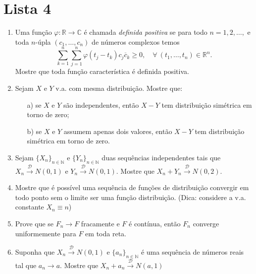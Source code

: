 \chapter*{Lista 4}
\chaptermark{}


\begin{enumerate}[leftmargin=*]


\item 
Uma função $\varphi :\mathbb{R}\to\mathbb{C}$
é chamada {\it definida positiva} se para todo
$n=1,2,\ldots,$ e toda $n$-úpla $(c_1,\ldots,c_n)$
de números complexos temos
\[
	\sum_{k=1}^{n}\sum_{j=1}^{n}
	\varphi(t_j-t_k)c_j\overline{c}_k
	\geq 0,
	\quad
	\forall \ (t_1,\ldots,t_n)\in\mathbb{R}^n.
\]
Mostre que toda função característica é definida positiva.  


\item
Sejam $X$ e $Y$ v.a. com mesma distribuição. 
Mostre que: 
	\begin{itemize}
	\item[a)]
	se $X$ e $Y$ são independentes, então $X-Y$ tem
	distribuição simétrica em torno de zero;
	
	\item[b)]
	se $X$ e $Y$ assumem apenas dois valores, então 
	$X-Y$ tem distribuição simétrica em torno de zero.
	\end{itemize}



\item 
Sejam $\{X_n\}_{n\in\mathbb{N}}$ e $\{Y_n\}_{n\in\mathbb{N}}$
duas sequências independentes tais que  
$X_n \overset{\mathscr{D}}{\rightarrow} N(0,1)$ 
e
$Y_n \overset{\mathscr{D}}{\rightarrow} N(0,1)$.
Mostre que $X_n+Y_n \overset{\mathscr{D}}{\rightarrow} N(0,2)$.


\item Mostre que é possível uma sequência de funções 
de distribuição convergir em todo ponto sem o limite 
ser uma função distribuição.
(Dica: considere a v.a. constante $X_n\equiv n$)



\item Prove que se $F_n \to F$ fracamente e $F$ 
é contínua, então $F_n$ converge uniformemente para
$F$ em toda reta. 





\item Suponha que 
$X_n \overset{\mathscr{D}}{\rightarrow} N(0,1)$ 
e $\{a_n\}_{n\in\mathbb{N}}$ é uma sequência 
de números reais tal que $a_n\to a$. 
Mostre que 
$X_n+a_n \overset{\mathscr{D}}{\rightarrow} N(a,1)$ 





\end{enumerate}
